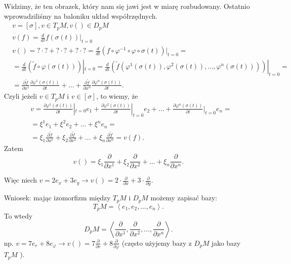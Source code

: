 \documentclass[../main.tex]{subfiles}
\begin{document}
    Widzimy, że ten obrazek, który nam się jawi jest w miarę rozbudowany.
    Ostatnio wprowadziliśmy na baloniku układ współrzędnych.\\
    \begin{align*}
        &v = [\sigma], v\in T_pM, v\left(  \right) \in D_pM\\
        &v(f) = \frac{d}{dt}f(\sigma(t))|_{t=0} \\
        &v\left(  \right) = ?\cdot ? + ?\cdot ? + ?\cdot ? = \frac{d}{dt}(f\circ \varphi^{-1} \circ \varphi \circ \sigma(t))|_{t=0}=\\
        &= \frac{d}{dt}(\tilde f\circ \varphi(\sigma(t)))|_{t=0} = \frac{d}{dt}(\tilde f(\varphi^1(\sigma(t)),\varphi^2(\sigma(t)),\ldots,\varphi^n(\sigma(t))))|_{t=0}= \\
        &= \frac{\partial \tilde f}{\partial x^1} \frac{\partial \varphi^1(\sigma(t))}{\partial t} +\ldots+\frac{\partial \tilde f}{\partial x^n} \frac{\partial \varphi^n(\sigma(t))}{\partial t}
    .\end{align*}
    Czyli jeżeli $v\in T_pM$ i $v\in[\sigma]$, to wiemy, że
    \begin{align*}
        &v = \frac{\partial \varphi^1(\sigma(t))}{\partial t}|_{t=0} e_1 + \frac{\partial \varphi^2(\sigma(t))}{\partial t}|_{t=0} e_2 + \ldots + \frac{\partial \varphi^n(\sigma(t))}{\partial t}|_{t=0} e_n= \\
        &= \xi^1e_1 + \xi^2e_2 + \ldots + \xi^ne_n = \\
        &= \xi_1 \frac{\partial \tilde f}{\partial x^1} + \xi_2 \frac{\partial \tilde f}{\partial x^2} +\ldots+ \xi_n \frac{\partial \tilde f}{\partial x^n} = v(f)
    .\end{align*}
    Zatem \[
        v\left(  \right) = \xi_1 \frac{\partial }{\partial x^1} + \xi_2 \frac{\partial }{\partial x^2}  + \ldots + \xi_n \frac{\partial }{\partial x^n}
    .\]
    \begin{przyklad}
        Więc niech $v = 2e_x + 3e_y \to v\left(  \right) = 2 \cdot \frac{\partial }{\partial x} + 3 \cdot \frac{\partial }{\partial y} $.
    \end{przyklad}
    Wniosek: mając izomorfizm między $T_pM$ i $D_pM$ możemy zapisać bazy:
    \[
    T_pM = \left<e_1,e_2,\ldots,e_n \right>
    .\]
    To wtedy
    \[
    D_pM = \left<\frac{\partial }{\partial x^1} , \frac{\partial }{\partial x^2} ,\ldots,\frac{\partial }{\partial x^n}  \right>
    .\]
    np. $v = 7 e_r + 8 e_\varphi \to v\left(  \right) = 7 \frac{\partial }{\partial r} + 8 \frac{\partial }{\partial \varphi} $ (często użyjemy bazy z $D_pM$ jako bazy $T_pM$ ).
\end{document}
